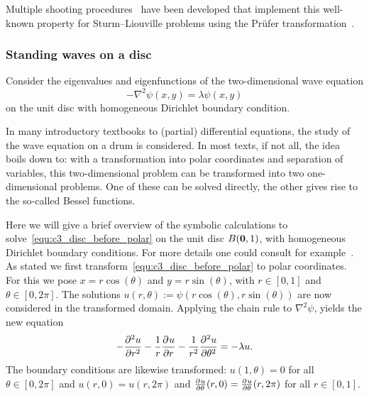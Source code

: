 Multiple shooting procedures~\cite{baeyens_fast_2020,ledoux_matslise_2016,ixaru_cp_2000} have been developed that implement this well-known property for Sturm--Liouville problems using the Prüfer transformation~\cite{pruefer_neue_1926}.

\subsubsection{Standing waves on a disc}\label{sec:c3_standing_waves_on_disc}

Consider the eigenvalues and eigenfunctions of the two-dimensional wave equation
\begin{equation}\label{equ:c3_disc_before_polar}
  -\nabla^2 \psi(x, y) = \lambda \psi(x, y)
\end{equation}
on the unit disc with homogeneous Dirichlet boundary condition.

In many introductory textbooks to (partial) differential equations, the study of the wave equation on a drum is considered. In most texts, if not all, the idea boils down to: with a transformation into polar coordinates and separation of variables, this two-dimensional problem can be transformed into two one-dimensional problems. One of these can be solved directly, the other gives rise to the so-called Bessel functions.

Here we will give a brief overview of the symbolic calculations to solve~\eqref{equ:c3_disc_before_polar} on the unit disc $B(\vb{0}, 1)$, with homogeneous Dirichlet boundary conditions. For more details one could consult for example~\cite[chapter~4]{asmar_partial_2005}. As stated we first transform~\eqref{equ:c3_disc_before_polar} to polar coordinates. For this we pose $x = r\cos(\theta)$ and $y = r\sin(\theta)$, with $r \in [0,1]$ and $\theta \in [0, 2\pi]$. The solutions $u(r, \theta) := \psi(r\cos(\theta), r\sin(\theta))$ are now considered in the transformed domain. Applying the chain rule to $\nabla^2\psi$, yields the new equation
\begin{equation}\label{equ:c3_disc_after_polar}
  -{\pdv[2]{u}{r}} - \frac{1}{r}{\pdv[]{u}{r}} - \frac{1}{r^2} {\pdv[2]{u}{\theta}} = - \lambda u\text{.}
\end{equation}
The boundary conditions are likewise transformed: $u(1, \theta) = 0$ for all $\theta \in [0, 2\pi]$ and $u(r, 0) = u(r, 2\pi)$ and ${\pdv[]{u}{\theta}}(r, 0) = {\pdv[]{u}{\theta}}(r, 2\pi)$ for all $r \in [0, 1]$.

